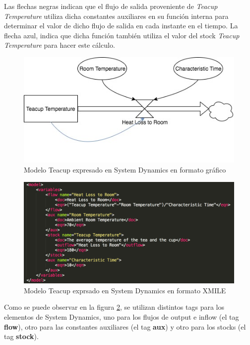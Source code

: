 Las flechas negras indican que el flujo de salida proveniente de \textit{Teacup Temperature} utiliza dicha constantes auxiliares en su función interna para determinar el valor de dicho flujo de salida en cada instante en el tiempo. La flecha azul, indica que dicha función también utiliza el valor del stock \textit{Teacup Temperature} para hacer este cálculo. 

\begin{figure}[!h]
\centering
\includegraphics[scale=0.5]{imagenes/Teacup_sd.jpg}
\caption{Modelo Teacup expresado en System Dynamics en formato gráfico}
\label{fig:Teacup_sd}
\end{figure}

\begin{figure}[!h]
\centering
\includegraphics[scale=0.5]{imagenes/teacup_mapeo/Teacup_variables}
\caption{Modelo Teacup exprsado en System Dynamics en formato XMILE}
\label{fig:Teacup_xmile}
\end{figure}

Como se puede observar en la figura \ref{fig:Teacup_xmile}, se utilizan distintos tags para los elementos de System Dynamics, uno para los flujos de output e inflow (el tag \textbf{flow}), otro para las constantes auxiliares (el tag \textbf{aux}) y otro para los stocks (el tag \textbf{stock}). 

